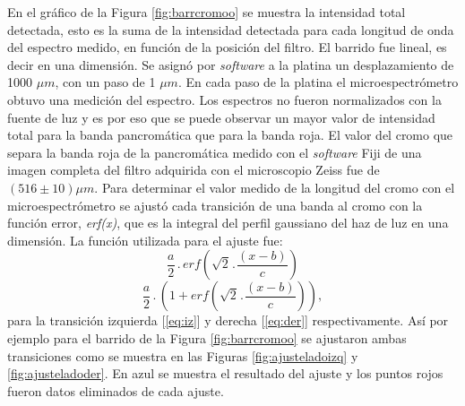 En el gráfico de la Figura \ref{fig:barrcromoo} se muestra la intensidad total detectada, esto es la suma de la intensidad detectada para cada longitud de onda del espectro medido, en función de la posición del filtro. El barrido fue lineal, es decir en una dimensión. Se asignó por \textit{software} a la platina un desplazamiento de 1000 $\mu m$, con un paso de 1 $\mu m$. En cada paso de la platina el microespectrómetro obtuvo una medición del espectro. Los espectros no fueron normalizados con la fuente de luz y es por eso que se puede observar un mayor valor de intensidad total para la banda pancromática que para la banda roja. El valor del cromo que separa la banda roja de la pancromática medido con el \textit{software} Fiji de una imagen completa del filtro adquirida con el microscopio Zeiss fue de $( 516 \pm 10) \mu m$.
Para determinar el valor medido de la longitud del cromo con el microespectrómetro se ajustó cada transición de una banda al cromo con la función error, \textit{erf(x)}, que es la integral del perfil gaussiano del haz de luz en una dimensión. La función utilizada para el ajuste fue:
\begin{equation}
\frac{a}{2}\hspace{2pt}.\hspace{2pt}erf\left(\sqrt{2}\hspace{1pt}.\hspace{1pt}\frac{(x-b)}{c}\right)
\label{eq:iz}
\end{equation}
\begin{equation}
\frac{a}{2}\hspace{2pt}.\hspace{2pt}\left(1+erf\left(\sqrt{2}\hspace{1pt}.\hspace{1pt}\frac{(x-b)}{c}\right)\right),
\label{eq:der}
 \end{equation} para la transición izquierda [\ref{eq:iz}] y derecha [\ref{eq:der}] respectivamente. Así por ejemplo para el barrido de la Figura \ref{fig:barrcromoo} se ajustaron ambas transiciones como se muestra en las Figuras \ref{fig:ajusteladoizq} y \ref{fig:ajusteladoder}. En azul se muestra el resultado del ajuste y los puntos rojos fueron datos eliminados de cada ajuste.
